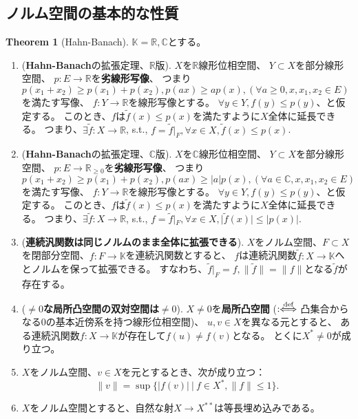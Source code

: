 \documentclass[uplatex]{jsarticle}
\theoremstyle{definition}
\newtheorem{thm}{Theorem}[section]
\newcommand{\deff}{:\hspace{-3pt}\overset{\text{def}}{\iff}}
\newcommand{\C}{\mathbb{C}}
\newcommand{\K}{\mathbb{K}}
\newcommand{\R}{\mathbb{R}}
\begin{document}
\subsection{ノルム空間の基本的な性質}


\begin{thm}[Hahn-Banach]
  \label{H-B}
  \(\K=\R,\C\)とする。
  \begin{enumerate}
    \item \label{H-B, R}
    (\textbf{Hahn-Banach}の拡張定理、\(\R\)版).
    \(X\)を\(\R\)線形位相空間、
    \(Y\subset X\)を部分線形空間、
    \(p:E\to \R\)を\textbf{劣線形写像}、
    つまり\(p(x_1+x_2)\geq p(x_1)+p(x_2), p(ax)\geq ap(x), (\forall a\geq 0, x,x_1,x_2\in E)\)
    を満たす写像、
    \(f:Y\to \R\)を線形写像とする。
    \(\forall y\in Y, f(y) \leq p(y)\)、と仮定する。
    このとき、\(f\)は\(\tilde{f}(x)\leq p(x)\)を満たすように\(X\)全体に延長できる。
    つまり、\(\exists \tilde{f}:X\to \R\), s.t.,
    \(f=\tilde{f}|_F, \forall x\in X, \tilde{f}(x) \leq p(x)\).
    \item \label{H-B, C}
    (\textbf{Hahn-Banach}の拡張定理、\(\C\)版).
    \(X\)を\(\C\)線形位相空間、
    \(Y\subset X\)を部分線形空間、
    \(p:E\to \R_{\geq 0}\)を\textbf{劣線形写像}、
    つまり\(p(x_1+x_2)\geq p(x_1)+p(x_2), p(ax)\geq |a|p(x), (\forall a\in \C, x,x_1,x_2\in E)\)
    を満たす写像、
    \(f:Y\to \R\)を線形写像とする。
    \(\forall y\in Y, f(y) \leq p(y)\)、と仮定する。
    このとき、\(f\)は\(\tilde{f}(x)\leq p(x)\)を満たすように\(X\)全体に延長できる。
    つまり、\(\exists \tilde{f}:X\to \R\), s.t.,
    \(f=\tilde{f}|_F, \forall x\in X, |\tilde{f}(x)| \leq |p(x)|\).
    \item \label{functional ext}
    (\textbf{連続汎関数は同じノルムのまま全体に拡張できる}).
    \(X\)をノルム空間、\(F\subset X\)を閉部分空間、\(f:F\to \K\)を連続汎関数とすると、
    \(f\)は連続汎関数\(\tilde{f}:X\to \K\)へとノルムを保って拡張できる。
    すなわち、\(\tilde{f}|_F=f, \|\tilde{f}\| = \|f\|\)となる\(\tilde{f}\)が存在する。
    \item \label{locally conv dual}
    (\textbf{\(\neq 0\)な局所凸空間の双対空間は\(\neq 0\)}).
    \(X\neq 0\)を\textbf{局所凸空間} (\(\deff\)凸集合からなる\(0\)の基本近傍系を持つ線形位相空間)、
    \(u,v\in X\)を異なる元とすると、
    ある連続汎関数\(f:X\to \K\)が存在して\(f(u)\neq f(v)\)となる。
    とくに\(X^*\neq 0\)が成り立つ。
    \item \label{norm eq}
    \(X\)をノルム空間、\(v\in X\)を元とするとき、次が成り立つ：
    \[
    \|v\| = \sup\{|f(v)| \ | \ f\in X^*, \|f\| \leq 1\}.
    \]
    \item \label{2dual inj}
    \(X\)をノルム空間とすると、自然な射\(X\to X^{**}\)は等長埋め込みである。
  \end{enumerate}
\end{thm}
\end{document}
